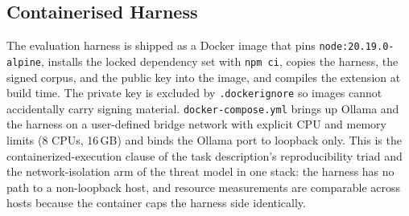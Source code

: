 \subsection{Containerised Harness}
\label{sec:impl-container}

The evaluation harness is shipped as a Docker image that pins \texttt{node:20.19.0-alpine}, installs the locked dependency set with \texttt{npm ci}, copies the harness, the signed corpus, and the public key into the image, and compiles the extension at build time. The private key is excluded by \texttt{.dockerignore} so images cannot accidentally carry signing material. \texttt{docker-compose.yml} brings up Ollama and the harness on a user-defined bridge network with explicit CPU and memory limits (8 CPUs, 16\,GB) and binds the Ollama port to loopback only. This is the containerized-execution clause of the task description's reproducibility triad and the network-isolation arm of the threat model in one stack: the harness has no path to a non-loopback host, and resource measurements are comparable across hosts because the container caps the harness side identically.
